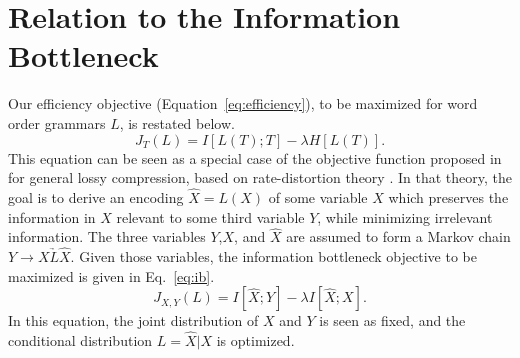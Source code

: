 \documentclass[12pt]{article}
\begin{document}









\section{Relation to the Information Bottleneck}

Our efficiency objective (Equation~\ref{eq:efficiency}), to be maximized for word order grammars $L$, is restated below.
\begin{equation}
    \label{eq:efficiency-again}
    J_T(L) = I[L(T); T] - \lambda H[L(T)].
\end{equation}
This equation can be seen as a special case of the objective function proposed in \citet{tishby1999information} for general lossy compression, based on rate-distortion theory \citep{cover2006elements,harremoes2007information}. In that theory, the goal is to derive an encoding $\hat{X}=L(X)$ of some variable $X$ which preserves the information in $X$ relevant to some third variable $Y$, while minimizing irrelevant information. The three variables $Y$,$X$, and $\hat{X}$ are assumed to form a Markov chain $Y \rightarrow X \underrightarrow{L} \hat{X}$. Given those variables, the information bottleneck objective to be maximized is given in Eq.~\ref{eq:ib}.
\begin{equation}
    \label{eq:ib}
    J_{X,Y}(L) = I[\hat{X}; Y] - \lambda I[\hat{X}; X].
\end{equation}
In this equation, the joint distribution of $X$ and $Y$ is seen as fixed, and the conditional distribution $L=\hat{X}|X$ is optimized.
\end{document}
